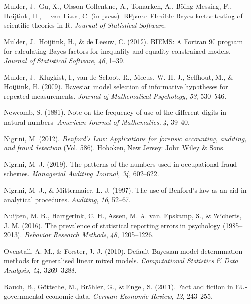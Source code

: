 \documentclass[
  english,
  man,floatsintext]{apa6}
\begin{document}
\leavevmode\hypertarget{ref-mulderBfpackInPress}{}%
Mulder, J., Gu, X., Olsson-Collentine, A., Tomarken, A., Böing-Messing, F., Hoijtink, H., \ldots{} van Lissa, C. (in press). BFpack: Flexible Bayes factor testing of scientific theories in R. \emph{Journal of Statistical Software}.

\leavevmode\hypertarget{ref-mulder2012biems}{}%
Mulder, J., Hoijtink, H., \& de Leeuw, C. (2012). BIEMS: A Fortran 90 program for calculating Bayes factors for inequality and equality constrained models. \emph{Journal of Statistical Software}, \emph{46}, 1--39.

\leavevmode\hypertarget{ref-mulder2009bayesian}{}%
Mulder, J., Klugkist, I., van de Schoot, R., Meeus, W. H. J., Selfhout, M., \& Hoijtink, H. (2009). Bayesian model selection of informative hypotheses for repeated measurements. \emph{Journal of Mathematical Psychology}, \emph{53}, 530--546.

\leavevmode\hypertarget{ref-newcomb1881note}{}%
Newcomb, S. (1881). Note on the frequency of use of the different digits in natural numbers. \emph{American Journal of Mathematics}, \emph{4}, 39--40.

\leavevmode\hypertarget{ref-nigrini2012benford}{}%
Nigrini, M. (2012). \emph{Benford's Law: Applications for forensic accounting, auditing, and fraud detection} (Vol. 586). Hoboken, New Jersey: John Wiley \& Sons.

\leavevmode\hypertarget{ref-nigrini2019patterns}{}%
Nigrini, M. J. (2019). The patterns of the numbers used in occupational fraud schemes. \emph{Managerial Auditing Journal}, \emph{34}, 602--622.

\leavevmode\hypertarget{ref-nigrini1997use}{}%
Nigrini, M. J., \& Mittermaier, L. J. (1997). The use of Benford's law as an aid in analytical procedures. \emph{Auditing}, \emph{16}, 52--67.

\leavevmode\hypertarget{ref-nuijten2016prevalence}{}%
Nuijten, M. B., Hartgerink, C. H., Assen, M. A. van, Epskamp, S., \& Wicherts, J. M. (2016). The prevalence of statistical reporting errors in psychology (1985--2013). \emph{Behavior Research Methods}, \emph{48}, 1205--1226.

\leavevmode\hypertarget{ref-overstall2010default}{}%
Overstall, A. M., \& Forster, J. J. (2010). Default Bayesian model determination methods for generalised linear mixed models. \emph{Computational Statistics \& Data Analysis}, \emph{54}, 3269--3288.

\leavevmode\hypertarget{ref-rauch2011fact}{}%
Rauch, B., Göttsche, M., Brähler, G., \& Engel, S. (2011). Fact and fiction in EU-governmental economic data. \emph{German Economic Review}, \emph{12}, 243--255.
\end{document}
